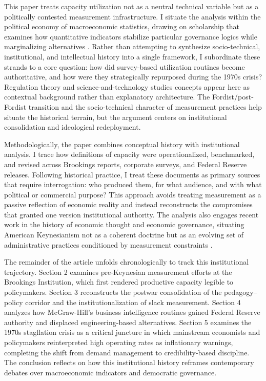 \documentclass[11pt]{article}
\begin{document}
This paper treats capacity utilization not as a neutral technical variable but as a politically contested measurement infrastructure. I situate the analysis within the political economy of macroeconomic statistics, drawing on scholarship that examines how quantitative indicators stabilize particular governance logics while marginalizing alternatives \citep{porter1995,block2008,krippner2011}. Rather than attempting to synthesize socio-technical, institutional, and intellectual history into a single framework, I subordinate these strands to a core question: how did survey-based utilization routines become authoritative, and how were they strategically repurposed during the 1970s crisis? Regulation theory and science-and-technology studies concepts appear here as contextual background rather than explanatory architecture. The Fordist/post-Fordist transition and the socio-technical character of measurement practices help situate the historical terrain, but the argument centers on institutional consolidation and ideological redeployment.

Methodologically, the paper combines conceptual history with institutional analysis. I trace how definitions of capacity were operationalized, benchmarked, and revised across Brookings reports, corporate surveys, and Federal Reserve releases. Following historical practice, I treat these documents as primary sources that require interrogation: who produced them, for what audience, and with what political or commercial purpose? This approach avoids treating measurement as a passive reflection of economic reality and instead reconstructs the compromises that granted one version institutional authority. The analysis also engages recent work in the history of economic thought and economic governance, situating American Keynesianism not as a coherent doctrine but as an evolving set of administrative practices conditioned by measurement constraints \citep{barber1987,backhouse2015}.

The remainder of the article unfolds chronologically to track this institutional trajectory. Section 2 examines pre-Keynesian measurement efforts at the Brookings Institution, which first rendered productive capacity legible to policymakers. Section 3 reconstructs the postwar consolidation of the pedagogy--policy corridor and the institutionalization of slack measurement. Section 4 analyzes how McGraw-Hill's business intelligence routines gained Federal Reserve authority and displaced engineering-based alternatives. Section 5 examines the 1970s stagflation crisis as a critical juncture in which mainstream economists and policymakers reinterpreted high operating rates as inflationary warnings, completing the shift from demand management to credibility-based discipline. The conclusion reflects on how this institutional history reframes contemporary debates over macroeconomic indicators and democratic governance.
\end{document}

